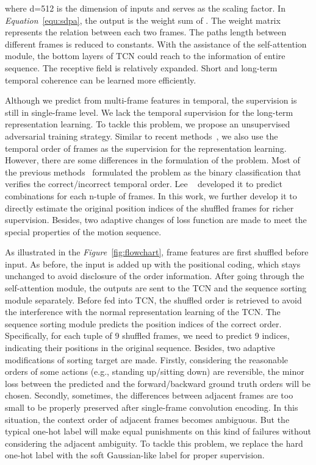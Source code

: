 \documentclass[10pt,twocolumn,letterpaper]{article}
\begin{document}
where d=512 is the dimension of inputs and serves as the scaling factor. In \textit{Equation}~\ref{equ:sdpa}, the output is the weight sum of . The weight matrix represents the relation between each two frames. The paths length between different frames is reduced to constants. With the assistance of the self-attention module, the bottom layers of TCN could reach to the information of entire sequence. The receptive field is relatively expanded. Short and long-term temporal coherence can be learned more efficiently.

Although we predict from multi-frame features in temporal, the supervision is still in single-frame level. We lack the temporal supervision for the long-term representation learning. To tackle this problem, we propose an unsupervised adversarial training strategy. Similar to recent methods~\cite{misra2016shufflebinary,sumer2017shufflebinary,fernando2017shufflebinary,sortingsequence}, we also use the temporal order of frames as the supervision for the representation learning. However, there are some differences in the formulation of the problem. Most of the previous methods~\cite{misra2016shufflebinary,sumer2017shufflebinary,fernando2017shufflebinary} formulated the problem as the binary classification that verifies the correct/incorrect temporal order. Lee \etal~\cite{sortingsequence} developed it to predict  combinations for each n-tuple of frames. In this work, we further develop it to directly estimate the original position indices of the shuffled frames for richer supervision. Besides, two adaptive changes of loss function are made to meet the special properties of the motion sequence.



As illustrated in the \textit{Figure}~\ref{fig:flowchart}, frame features are first shuffled before input. As before, the input is added up with the positional coding, which stays unchanged to avoid disclosure of the order information. After going through the self-attention module, the outputs are sent to the TCN and the sequence sorting module separately. Before fed into TCN, the shuffled order is retrieved to avoid the interference with the normal representation learning of the TCN. The sequence sorting module predicts the position indices of the correct order. Specifically, for each tuple of 9 shuffled frames, we need to predict 9 indices, indicating their positions in the original sequence. Besides, two adaptive modifications of sorting target are made. Firstly, considering the reasonable orders of some actions (e.g., standing up/sitting down) are reversible, the minor loss between the predicted and the forward/backward ground truth orders will be chosen. Secondly, sometimes, the differences between adjacent frames are too small to be properly preserved after single-frame convolution encoding. In this situation, the context order of adjacent frames becomes ambiguous. But the typical one-hot label will make equal punishments on this kind of failures without considering the adjacent ambiguity. To tackle this problem, we replace the hard one-hot label with the soft Gaussian-like label for proper supervision. 
\end{document}

